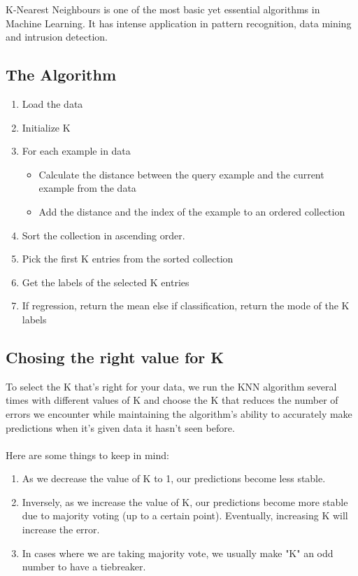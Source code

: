 K-Nearest Neighbours is one of the most basic yet essential algorithms in Machine Learning. It has intense application in pattern recognition, data mining and intrusion detection.

\subsection*{The Algorithm}
    \begin{enumerate}
        \item Load the data
        \item Initialize K
        \item For each example in data
        \begin{itemize}
            \item Calculate the distance between the query example and the current example from the data
            \item Add the distance and the index of the example to an ordered collection
        \end{itemize}
        \item Sort the collection in ascending order.
        \item Pick the first K entries from the sorted collection
        \item Get the labels of the selected K entries
        \item If regression, return the mean else if classification, return the mode of the K labels
    \end{enumerate}

\subsection*{Chosing the right value for K}
    To select the K that’s right for your data, we run the KNN algorithm several times with different values of K and choose the K that reduces the number of errors we encounter while maintaining the algorithm’s ability to accurately make predictions when it’s given data it hasn’t seen before.\\ \\
    Here are some things to keep in mind:
    \begin{enumerate}
        \item As we decrease the value of K to 1, our predictions become less stable.
        \item Inversely, as we increase the value of K, our predictions become more stable due to majority voting (up to a certain point). Eventually, increasing K will increase the error.
        \item In cases where we are taking majority vote, we usually make "K" an odd number to have a tiebreaker. 
    \end{enumerate}

